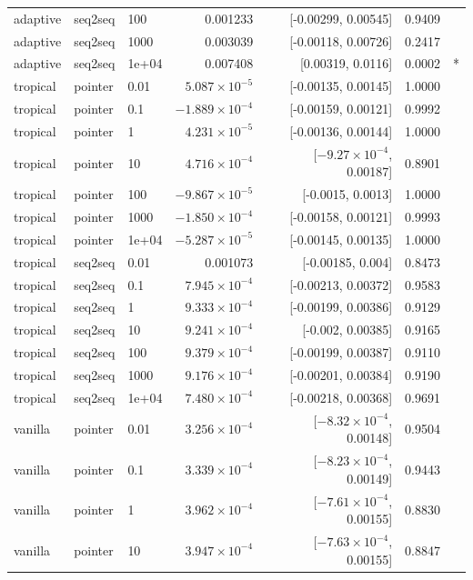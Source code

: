 \documentclass[10pt]{article}
\begin{document}
{\begin{longtable}{lllrrrl}
adaptive & seq2seq & 100 & 0.001233 & [-0.00299, 0.00545] & 0.9409 & \\
adaptive & seq2seq & 1000 & 0.003039 & [-0.00118, 0.00726] & 0.2417 & \\
adaptive & seq2seq & 1e+04 & 0.007408 & [0.00319, 0.0116] & 0.0002 & *\\
tropical & pointer & 0.01 & $5.087\times10^{-5}$ & [-0.00135, 0.00145] & 1.0000 & \\
tropical & pointer & 0.1 & $-1.889\times10^{-4}$ & [-0.00159, 0.00121] & 0.9992 & \\
tropical & pointer & 1 & $4.231\times10^{-5}$ & [-0.00136, 0.00144] & 1.0000 & \\
tropical & pointer & 10 & $4.716\times10^{-4}$ & [$-9.27\times10^{-4}$, 0.00187] & 0.8901 & \\
tropical & pointer & 100 & $-9.867\times10^{-5}$ & [-0.0015, 0.0013] & 1.0000 & \\
tropical & pointer & 1000 & $-1.850\times10^{-4}$ & [-0.00158, 0.00121] & 0.9993 & \\
tropical & pointer & 1e+04 & $-5.287\times10^{-5}$ & [-0.00145, 0.00135] & 1.0000 & \\
tropical & seq2seq & 0.01 & 0.001073 & [-0.00185, 0.004] & 0.8473 & \\
tropical & seq2seq & 0.1 & $7.945\times10^{-4}$ & [-0.00213, 0.00372] & 0.9583 & \\
tropical & seq2seq & 1 & $9.333\times10^{-4}$ & [-0.00199, 0.00386] & 0.9129 & \\
tropical & seq2seq & 10 & $9.241\times10^{-4}$ & [-0.002, 0.00385] & 0.9165 & \\
tropical & seq2seq & 100 & $9.379\times10^{-4}$ & [-0.00199, 0.00387] & 0.9110 & \\
tropical & seq2seq & 1000 & $9.176\times10^{-4}$ & [-0.00201, 0.00384] & 0.9190 & \\
tropical & seq2seq & 1e+04 & $7.480\times10^{-4}$ & [-0.00218, 0.00368] & 0.9691 & \\
vanilla & pointer & 0.01 & $3.256\times10^{-4}$ & [$-8.32\times10^{-4}$, 0.00148] & 0.9504 & \\
vanilla & pointer & 0.1 & $3.339\times10^{-4}$ & [$-8.23\times10^{-4}$, 0.00149] & 0.9443 & \\
vanilla & pointer & 1 & $3.962\times10^{-4}$ & [$-7.61\times10^{-4}$, 0.00155] & 0.8830 & \\
vanilla & pointer & 10 & $3.947\times10^{-4}$ & [$-7.63\times10^{-4}$, 0.00155] & 0.8847 & \\

\end{longtable}}
\end{document}
